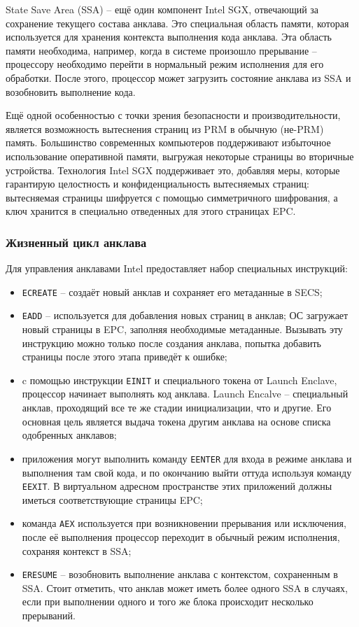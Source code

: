 State Save Area (SSA) -- ещё один компонент Intel SGX, отвечающий за сохранение текущего состава анклава. Это специальная область памяти, которая используется для хранения контекста выполнения кода анклава. Эта область памяти необходима, например, когда в системе произошло прерывание -- процессору необходимо перейти в нормальный режим исполнения для его обработки. После этого, процессор может загрузить состояние анклава из SSA и возобновить выполнение кода.

Ещё одной особенностью с точки зрения безопасности и производительности, является возможность вытеснения страниц из PRM в обычную (не-PRM) память. Большинство современных компьютеров поддерживают избыточное использование оперативной памяти, выгружая некоторые страницы во вторичные устройства. Технология Intel SGX поддерживает это, добавляя меры, которые гарантирую целостность и конфиденциальность вытесняемых страниц: вытесняемая страницы шифруется с помощью симметричного шифрования, а ключ хранится в специально отведенных для этого страницах EPC.

\subsubsection{Жизненный цикл анклава}

Для управления анклавами Intel предоставляет набор специальных инструкций:

\begin{itemize}
	\item \texttt{ECREATE} -- создаёт новый анклав и сохраняет его метаданные в SECS;
	\item \texttt{EADD} -- используется для добавления новых страниц в анклав; ОС загружает новый страницы в EPC, заполняя необходимые метаданные. Вызывать эту инструкцию можно только после создания анклава, попытка добавить страницы после этого этапа приведёт к ошибке;
	\item c помощью инструкции \texttt{EINIT} и специального токена от Launch Enclave, процессор начинает выполнять код анклава. Launch Encalve -- специальный анклав, проходящий все те же стадии инициализации, что и другие. Его основная цель является выдача токена другим анклава на основе списка одобренных анклавов;
	\item приложения могут выполнить команду \texttt{EENTER} для входа в режиме анклава и выполнения там свой кода, и по окончанию выйти оттуда используя команду \texttt{EEXIT}. В виртуальном адресном пространстве этих приложений должны иметься соответствующие страницы EPC;
	\item команда \texttt{AEX} используется при возникновении прерывания или исключения, после её выполнения процессор переходит в обычный режим исполнения, сохраняя контекст в SSA;
	\item \texttt{ERESUME} -- возобновить выполнение анклава с контекстом, сохраненным в SSA. Стоит отметить, что анклав может иметь более одного SSA в случаях, если при выполнении одного и того же блока происходит несколько прерываний.
\end{itemize}

